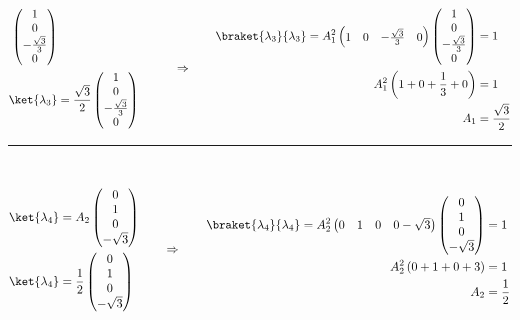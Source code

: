 \documentclass{article}
\begin{document}
\begin{enumerate}
\begin{equation}
\begin{split}
\begin{pmatrix}
					1 \\
					0 \\
					-\frac{\sqrt{3}}{3} \\
					0
				\end{pmatrix} \\
				\ket{\lambda_3} &= \frac{\sqrt{3}}{2} \begin{pmatrix}
					1 \\
					0 \\
					-\frac{\sqrt{3}}{3} \\
					0
				\end{pmatrix}
			\end{split}
			\qquad \Rightarrow \qquad
			\begin{split}
				\braket{\lambda_3}{\lambda_3} = A_1^2 \begin{pmatrix}
					1 & 0 & -\frac{\sqrt{3}}{3} & 0
				\end{pmatrix}
				\begin{pmatrix}
					1 \\
					0 \\
					-\frac{\sqrt{3}}{3} \\
					0
				\end{pmatrix} &= 1 \\
				A_1^2 \left( 1 + 0 + \frac{1}{3} + 0 \right) &= 1 \\
				A_1 &= \frac{\sqrt{3}}{2}
			\end{split}
		\end{equation}
		\noindent\hfil\rule{0.5\textwidth}{.4pt}\hfil \\
		\begin{equation}
			\begin{split}
				\ket{\lambda_4} &= A_2 \begin{pmatrix}
					0 \\
					1 \\
					0 \\
					-\sqrt{3}
				\end{pmatrix} \\
				\ket{\lambda_4} &= \frac{1}{2} \begin{pmatrix}
					0 \\
					1 \\
					0 \\
					-\sqrt{3}
				\end{pmatrix}
			\end{split}
			\qquad \Rightarrow \qquad
			\begin{split}
				\braket{\lambda_4}{\lambda_4} = A_2^2 \begin{pmatrix}
					0 & 1 & 0 & 0 -\sqrt{3}
				\end{pmatrix}
				\begin{pmatrix}
					0 \\
					1 \\
					0 \\
					-\sqrt{3}
				\end{pmatrix} &= 1 \\
				A_2^2 \left( 0 + 1 + 0 + 3 \right) &= 1 \\
				A_2 &= \frac{1}{2}
			\end{split}
		\end{equation}
		

\end{enumerate}
\end{document}

